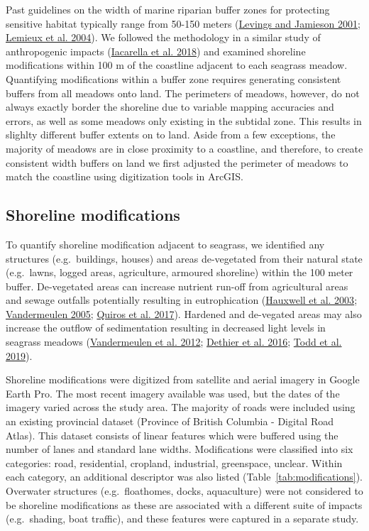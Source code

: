 \documentclass[12pt]{article}\usepackage[]{graphicx}\usepackage[]{color}
\begin{document}
Past guidelines on the width of marine riparian buffer zones for protecting sensitive habitat typically range from 50-150 meters (\protect\hyperlink{ref-Levings2001}{Levings and Jamieson 2001}; \protect\hyperlink{ref-Lemieux2004}{Lemieux et al. 2004}). We followed the methodology in a similar study of anthropogenic impacts (\protect\hyperlink{ref-Iacarella2018}{Iacarella et al. 2018}) and examined shoreline modifications within 100 m of the coastline adjacent to each seagrass meadow. Quantifying modifications within a buffer zone requires generating consistent buffers from all meadows onto land. The perimeters of meadows, however, do not always exactly border the shoreline due to variable mapping accuracies and errors, as well as some meadows only existing in the subtidal zone. This results in slighlty different buffer extents on to land. Aside from a few exceptions, the majority of meadows are in close proximity to a coastline, and therefore, to create consistent width buffers on land we first adjusted the perimeter of meadows to match the coastline using digitization tools in ArcGIS.

\hypertarget{shoreline-modifications}{%
\subsection{Shoreline modifications}\label{shoreline-modifications}}

To quantify shoreline modification adjacent to seagrass, we identified any structures (e.g.~buildings, houses) and areas de-vegetated from their natural state (e.g.~lawns, logged areas, agriculture, armoured shoreline) within the 100 meter buffer. De-vegetated areas can increase nutrient run-off from agricultural areas and sewage outfalls potentially resulting in eutrophication (\protect\hyperlink{ref-hauxwell2003}{Hauxwell et al. 2003}; \protect\hyperlink{ref-vandermeulen2005}{Vandermeulen 2005}; \protect\hyperlink{ref-Quiros2017}{Quiros et al. 2017}). Hardened and de-vegated areas may also increase the outflow of sedimentation resulting in decreased light levels in seagrass meadows (\protect\hyperlink{ref-Vandermeulen2012}{Vandermeulen et al. 2012}; \protect\hyperlink{ref-Dethier2016}{Dethier et al. 2016}; \protect\hyperlink{ref-Todd2019}{Todd et al. 2019}).

Shoreline modifications were digitized from satellite and aerial imagery in Google Earth Pro. The most recent imagery available was used, but the dates of the imagery varied across the study area. The majority of roads were included using an existing provincial dataset (Province of British Columbia - Digital Road Atlas). This dataset consists of linear features which were buffered using the number of lanes and standard lane widths. Modifications were classified into six categories: road, residential, cropland, industrial, greenspace, unclear. Within each category, an additional descriptor was also listed (Table~\ref{tab:modifications}). Overwater structures (e.g.~floathomes, docks, aquaculture) were not considered to be shoreline modifications as these are associated with a different suite of impacts (e.g.~shading, boat traffic), and these features were captured in a separate study.
\end{document}
